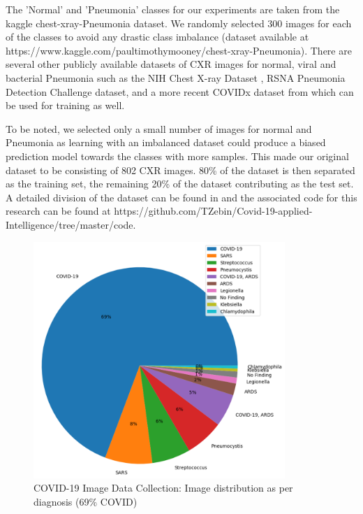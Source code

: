 The 'Normal' and 'Pneumonia' classes for our experiments are taken from the kaggle chest-xray-Pneumonia dataset. We randomly selected 300 images for each of the classes to avoid any drastic class imbalance (dataset available at {https://www.kaggle.com/paultimothymooney/chest-xray-Pneumonia}). There are several other publicly available datasets of CXR images for normal, viral and bacterial Pneumonia such as the NIH Chest X-ray Dataset \cite{jaeger2014two}, RSNA Pneumonia Detection Challenge dataset, and a more recent COVIDx dataset from \cite{wang2020covid} which can be used for training as well.
 
 To be noted, we selected only a small number of images for  normal and Pneumonia as learning with an imbalanced dataset could produce a biased prediction model towards the classes with more samples. This made our original dataset to be consisting of 802 CXR images. 80\% of the dataset is then separated as the training set, the remaining 20\% of the dataset contributing as the test set. A detailed division of the dataset can be found in  and the associated code for this research can be found at {https://github.com/TZebin/Covid-19-applied-Intelligence/tree/master/code}.
  
  





 \begin{figure}
\centering
\includegraphics[width=0.85\textwidth]{images/Finding_PA_Figure_1.png}
   \caption{COVID-19 Image Data Collection: Image distribution as per diagnosis (69\% COVID) }
\label{fig:data_dist}
\end{figure}
  
